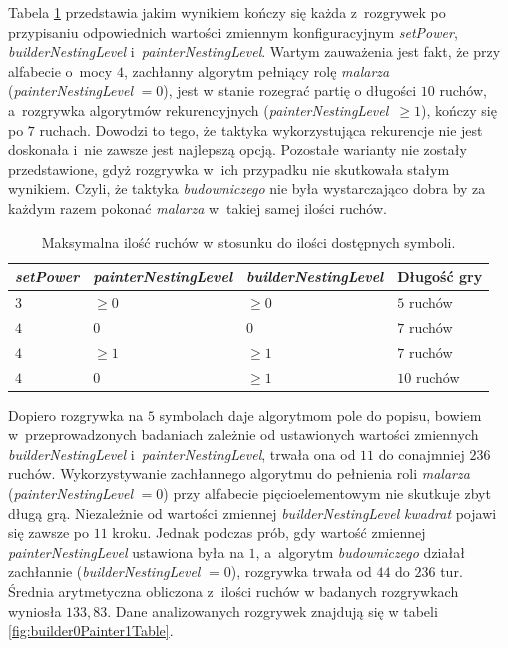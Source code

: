 \documentclass[document]{xmgr}
\begin{document}
Tabela \ref{fig:maxGameLength} przedstawia jakim wynikiem kończy się każda z~rozgrywek po przypisaniu odpowiednich wartości zmiennym konfiguracyjnym \emph{setPower}, \emph{builderNestingLevel} i~\emph{painterNestingLevel}. Wartym zauważenia jest fakt, że przy alfabecie o~mocy $4$, zachłanny algorytm pełniący rolę \emph{malarza} (\emph{painterNestingLevel} $=0$), jest w stanie rozegrać partię o długości $10$ ruchów, a~rozgrywka algorytmów rekurencyjnych \mbox{(\emph{painterNestingLevel} $\geq 1$)}, kończy się po $7$ ruchach. Dowodzi to tego, że taktyka wykorzystująca rekurencje nie jest doskonała i~nie zawsze jest najlepszą opcją. Pozostałe warianty nie zostały przedstawione, gdyż rozgrywka w~ich przypadku nie skutkowała stałym wynikiem. Czyli, że taktyka \emph{budowniczego} nie była wystarczająco dobra by za każdym razem pokonać \emph{malarza} w~takiej samej ilości ruchów.

\begin{table}[tbh]
    \centering
	\caption{Maksymalna ilość ruchów w stosunku do ilości dostępnych symboli.}
	\begin{tabular}{|l|l|l|l|} \hline
	\emph{setPower} & \emph{painterNestingLevel} & \emph{builderNestingLevel} & Długość gry \\ \hline
	$3$ & $\geq 0$ & $\geq 0$ & $5$ ruchów\\ \hline
	$4$ & $0$ & $0$ & $7$ ruchów\\ \hline
	$4$ & $\geq 1 $ & $\geq 1$ & $7$ ruchów\\ \hline
	$4$ & $0$ & $\geq 1$ & $10$ ruchów\\ \hline
	\end{tabular}
	\label{fig:maxGameLength}
\end{table}




Dopiero rozgrywka na $5$ symbolach daje algorytmom pole do popisu, bowiem w~przeprowadzonych badaniach zależnie od ustawionych wartości zmiennych \emph{builderNestingLevel} i~\emph{painterNestingLevel}, trwała ona od $11$ do conajmniej $236$ ruchów. Wykorzystywanie zachłannego algorytmu do pełnienia roli \emph{malarza} (\emph{painterNestingLevel} $=0$) przy alfabecie pięcioelementowym nie skutkuje zbyt długą grą. Niezależnie od wartości zmiennej \emph{builderNestingLevel} \emph{kwadrat} pojawi się zawsze po $11$ kroku. Jednak podczas prób, gdy wartość zmiennej \emph{painterNestingLevel} ustawiona była na $1$, a~algorytm \emph{budowniczego} działał zachłannie (\emph{builderNestingLevel} $=0$), rozgrywka trwała od $44$ do $236$ tur. Średnia arytmetyczna obliczona z~ilości ruchów w badanych rozgrywkach wyniosła $133,83$. Dane analizowanych rozgrywek znajdują się w tabeli \ref{fig:builder0Painter1Table}.
\end{document}

